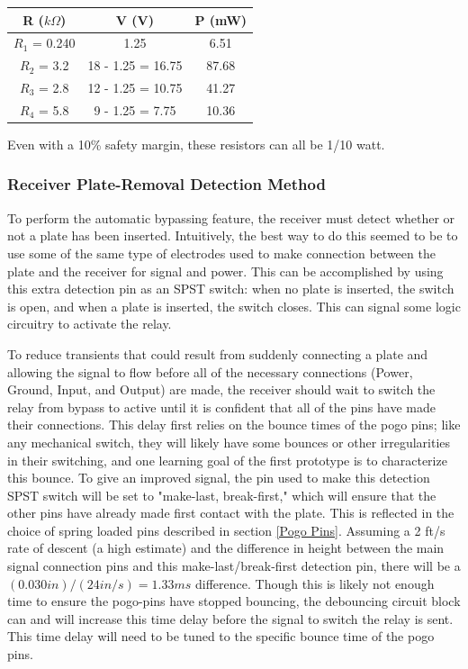 \documentclass{article}
\begin{document}
		\begin{center}
		\begin{tabular}{c c|c}
			R ($k\Omega$) & V (V) & P (mW) \\
			\hline
			$R_1$ = 0.240 & 1.25 & 6.51 \\
			$R_2$ = 3.2 & 18 - 1.25 = 16.75 & 87.68 \\
			$R_3$ = 2.8 & 12 - 1.25 = 10.75 & 41.27 \\
			$R_4$ = 5.8 & 9 - 1.25 = 7.75 & 10.36
		\end{tabular}
		\end{center}

		Even with a 10\% safety margin, these resistors can all be 1/10 watt.

		\subsubsection{Receiver Plate-Removal Detection Method}
		To perform the automatic bypassing feature, the receiver must detect whether or not a plate has been inserted. Intuitively, the best way to do this seemed to be to use some of the same type of electrodes used to make connection between the plate and the receiver for signal and power.  This can be accomplished by using this extra detection pin as an SPST switch: when no plate is inserted, the switch is open, and when a plate is inserted, the switch closes.  This can signal some logic circuitry to activate the relay.

		To reduce transients that could result from suddenly connecting a plate and allowing the signal to flow before all of the necessary connections (Power, Ground, Input, and Output) are made, the receiver should wait to switch the relay from bypass to active until it is confident that all of the pins have made their connections.  This delay first relies on the bounce times of the pogo pins; like any mechanical switch, they will likely have some bounces or other irregularities in their switching, and one learning goal of the first prototype is to characterize this bounce.  To give an improved signal, the pin used to make this detection SPST switch will be set to "make-last, break-first," which will ensure that the other pins have already made first contact with the plate.  This is reflected in the choice of spring loaded pins described in section \ref{Pogo Pins}.  Assuming a 2 ft/s rate of descent (a high estimate) and the difference in height between the main signal connection pins and this make-last/break-first detection pin, there will be a $(0.030 in)/(24 in/s) = 1.33 ms$ difference.  Though this is likely not enough time to ensure the pogo-pins have stopped bouncing, the debouncing circuit block can and will increase this time delay before the signal to switch the relay is sent.  This time delay will need to be tuned to the specific bounce time of the pogo pins.
\end{document}
